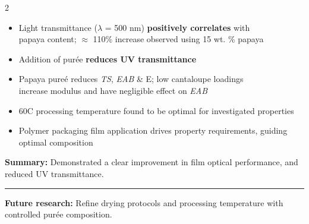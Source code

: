 \documentclass[
]{ImperialPoster}
\begin{document}
\begin{multicols}{2}
\begin{tcolorbox}[colback=white, colframe=ICLBlue, boxrule=4pt, arc=5pt]
	  \begin{itemize}
      \item Light transmittance ($\lambda$ = 500 nm) \textbf{positively correlates} with\\ papaya content; $\approx$ 110\% increase observed using 15 wt. \% papaya
      \item Addition of purée \textbf{reduces UV transmittance}
      \item Papaya pure\'{e} reduces \textit{TS}, \textit{EAB} \& E; low cantaloupe loadings\\ increase modulus and have negligible effect on \textit{EAB}
      \item 60\textdegree C processing temperature found to be optimal for investigated properties
      \item Polymer packaging film application drives property requirements, guiding optimal composition

    \end{itemize}
    \end{tcolorbox}




  
\vspace{1mm}
\textcolor{ICLBlue}{\textbf{Summary:}} Demonstrated a clear improvement in film optical performance, and reduced UV transmittance.\vspace{-0.5em}
\textcolor{ICLBlue}{\rule{\linewidth}{0.2pt}}
\textbf{\textcolor{ICLBlue}{Future research:}} {Refine drying protocols and processing temperature with controlled purée composition.}
  
\vspace{0.5em}

\end{multicols}
\end{document}
